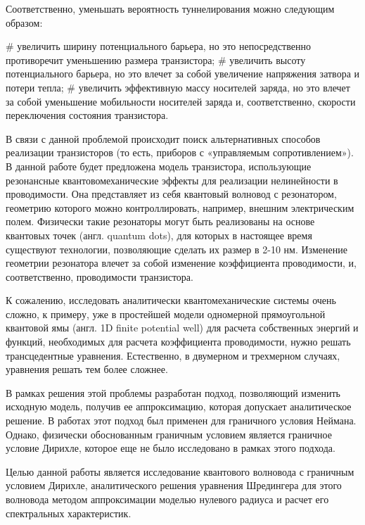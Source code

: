 Соответственно, уменьшать вероятность туннелирования можно следующим образом:

\begin{easylist}[itemize]
# увеличить ширину потенциального барьера, но это непосредственно противоречит уменьшению размера транзистора;
# увеличить высоту потенциального барьера, но это влечет за собой увеличение напряжения затвора и потери тепла;
# увеличить эффективную массу носителей заряда, но это влечет за собой уменьшение мобильности носителей заряда и, соответственно, скорости переключения состояния транзистора.
\end{easylist}

В связи с данной проблемой происходит поиск альтернативных способов реализации транзисторов (то есть, приборов с «управляемым сопротивлением»). В данной работе будет предложена модель транзистора, использующие резонансные квантовомеханические эффекты для реализации нелинейности в проводимости. Она представляет из себя квантовый волновод с резонатором, геометрию которого можно контроллировать, например, внешним электрическим полем. Физически такие резонаторы могут быть реализованы на основе квантовых точек (англ. quantum dots), для которых в настоящее время существуют технологии, позволяющие сделать их размер в 2-10 нм. Изменение геометрии резонатора влечет за собой изменение коэффициента проводимости, и, соответственно, проводимости транзистора.

К сожалению, исследовать аналитически квантомеханические системы очень сложно, к примеру, уже в простейшей модели одномерной прямоугольной квантовой ямы (англ. 1D finite potential well) для расчета собственных энергий и функций, необходимых для расчета коэффициента проводимости, нужно решать трансцедентные уравнения. Естественно, в двумерном и трехмерном случаях, уравнения решать тем более сложнее.

В рамках решения этой проблемы разработан подход, позволяющий изменить исходную модель, получив ее аппроксимацию, которая допускает аналитическое решение. В работах \cite{popov1992extension, popov1992resonator, popov1993zero} этот подход был применен для граничного условия Неймана. Однако, физически обоснованным граничным условием является граничное условие Дирихле, которое еще не было исследовано в рамках этого подхода.

Целью данной работы является исследование квантового волновода с граничным условием Дирихле, аналитического решения уравнения Шредингера для этого волновода методом аппроксимации моделью нулевого радиуса и расчет его спектральных характеристик.